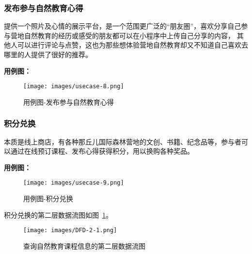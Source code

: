 \subsubsection{发布参与自然教育心得}

提供一个照片及心情的展示平台，是一个范围更广泛的“朋友圏”，喜欢分享自己参与营地自然教育的经历或感受的朋友都可以在小程序中上传自己分享的内容，
其他人可以进行评论与点赞，这也为那些想体验营地自然教育却又不知道自己喜欢去哪里的人提供了很好的推荐。

\textbf{用例图：}
\begin{figure}[H]
 \centering
 \texttt{[image: images/usecase-8.png]}
 \caption{
    用例图-发布参与自然教育心得
  }
 \vspace{-\medskipamount}
\end{figure}

\subsubsection{积分兑换}

本质是线上商店，有各种那丘儿国际森林营地的文创、书籍、纪念品等，参与者可以通过在线预订课程、发布心得获得积分，用以换购各种奖品。

\textbf{用例图：}
\begin{figure}[H]
 \centering
 \texttt{[image: images/usecase-9.png]}
 \caption{
    用例图-积分兑换
  }
 \vspace{-\medskipamount}
\end{figure}

积分兑换的第二层数据流图如图~\ref{fig:DFD-2-1}。

\begin{figure}[H]
 \centering
 \texttt{[image: images/DFD-2-1.png]}
 \caption{
    查询自然教育课程信息的第二层数据流图
  }
 \label{fig:DFD-2-1}
 \vspace{-\medskipamount}
\end{figure}
